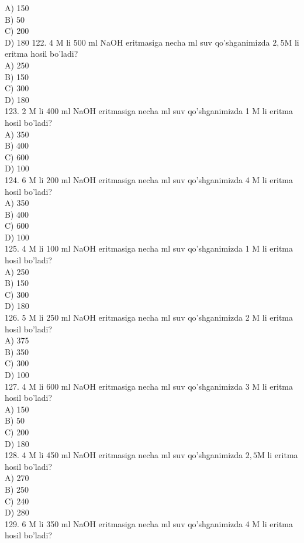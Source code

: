 A) 150\\
B) 50\\
C) 200\\
D) 180
122. 4 M li 500 ml NaOH eritmasiga necha ml suv qo'shganimizda $2,5 \mathrm{M}$ li eritma hosil bo'ladi?\\
A) 250\\
B) 150\\
C) 300\\
D) 180\\
123. 2 M li 400 ml NaOH eritmasiga necha ml suv qo'shganimizda 1 M li eritma hosil bo'ladi?\\
A) 350\\
B) 400\\
C) 600\\
D) 100\\
124. 6 M li 200 ml NaOH eritmasiga necha ml suv qo'shganimizda 4 M li eritma hosil bo'ladi?\\
A) 350\\
B) 400\\
C) 600\\
D) 100\\
125. 4 M li 100 ml NaOH eritmasiga necha ml suv qo'shganimizda 1 M li eritma hosil bo'ladi?\\
A) 250\\
B) 150\\
C) 300\\
D) 180\\
126. 5 M li 250 ml NaOH eritmasiga necha ml suv qo'shganimizda 2 M li eritma hosil bo'ladi?\\
A) 375\\
B) 350\\
C) 300\\
D) 100\\
127. 4 M li 600 ml NaOH eritmasiga necha ml suv qo'shganimizda 3 M li eritma hosil bo'ladi?\\
A) 150\\
B) 50\\
C) 200\\
D) 180\\
128. 4 M li 450 ml NaOH eritmasiga necha ml suv qo'shganimizda $2,5 \mathrm{M}$ li eritma hosil bo'ladi?\\
A) 270\\
B) 250\\
C) 240\\
D) 280\\
129. 6 M li 350 ml NaOH eritmasiga necha ml suv qo'shganimizda 4 M li eritma hosil bo'ladi?\\
